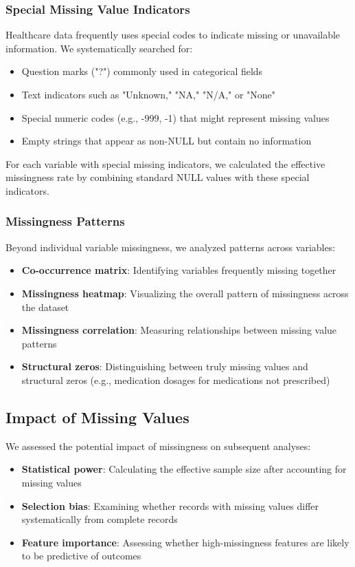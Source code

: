 \subsubsection{Special Missing Value Indicators}
Healthcare data frequently uses special codes to indicate missing or unavailable information. We systematically searched for:
\begin{itemize}
    \item Question marks ("?") commonly used in categorical fields
    \item Text indicators such as "Unknown," "NA," "N/A," or "None"
    \item Special numeric codes (e.g., -999, -1) that might represent missing values
    \item Empty strings that appear as non-NULL but contain no information
\end{itemize}

For each variable with special missing indicators, we calculated the effective missingness rate by combining standard NULL values with these special indicators.

\subsubsection{Missingness Patterns}
Beyond individual variable missingness, we analyzed patterns across variables:
\begin{itemize}
    \item \textbf{Co-occurrence matrix}: Identifying variables frequently missing together
    \item \textbf{Missingness heatmap}: Visualizing the overall pattern of missingness across the dataset
    \item \textbf{Missingness correlation}: Measuring relationships between missing value patterns
    \item \textbf{Structural zeros}: Distinguishing between truly missing values and structural zeros (e.g., medication dosages for medications not prescribed)
\end{itemize}

\subsection{Impact of Missing Values}
We assessed the potential impact of missingness on subsequent analyses:
\begin{itemize}
    \item \textbf{Statistical power}: Calculating the effective sample size after accounting for missing values
    \item \textbf{Selection bias}: Examining whether records with missing values differ systematically from complete records
    \item \textbf{Feature importance}: Assessing whether high-missingness features are likely to be predictive of outcomes
\end{itemize}

